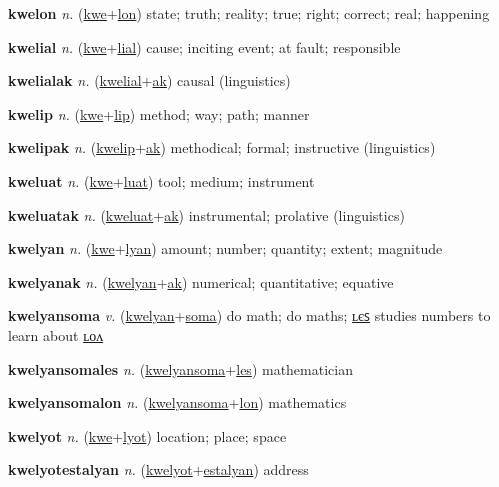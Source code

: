 \textbf{\hypertarget{kwelon}{kwelon}} \textit{n.} (\hyperlink{kwe}{kwe}+\allowbreak \hyperlink{lon}{lon})
state; truth; reality; true; right; correct; real; happening

\textbf{\hypertarget{kwelial}{kwelial}} \textit{n.} (\hyperlink{kwe}{kwe}+\allowbreak \hyperlink{lial}{lial})
cause; inciting event; at fault; responsible

\textbf{\hypertarget{kwelialak}{kwelialak}} \textit{n.} (\hyperlink{kwelial}{kwelial}+\allowbreak \hyperlink{ak}{ak})
causal (linguistics)

\textbf{\hypertarget{kwelip}{kwelip}} \textit{n.} (\hyperlink{kwe}{kwe}+\allowbreak \hyperlink{lip}{lip})
method; way; path; manner

\textbf{\hypertarget{kwelipak}{kwelipak}} \textit{n.} (\hyperlink{kwelip}{kwelip}+\allowbreak \hyperlink{ak}{ak})
methodical; formal; instructive (linguistics)

\textbf{\hypertarget{kweluat}{kweluat}} \textit{n.} (\hyperlink{kwe}{kwe}+\allowbreak \hyperlink{luat}{luat})
tool; medium; instrument

\textbf{\hypertarget{kweluatak}{kweluatak}} \textit{n.} (\hyperlink{kweluat}{kweluat}+\allowbreak \hyperlink{ak}{ak})
instrumental; prolative (linguistics)

\textbf{\hypertarget{kwelyan}{kwelyan}} \textit{n.} (\hyperlink{kwe}{kwe}+\allowbreak \hyperlink{lyan}{lyan})
amount; number; quantity; extent; magnitude

\textbf{\hypertarget{kwelyanak}{kwelyanak}} \textit{n.} (\hyperlink{kwelyan}{kwelyan}+\allowbreak \hyperlink{ak}{ak})
numerical; quantitative; equative

\textbf{\hypertarget{kwelyansoma}{kwelyansoma}} \textit{v.} (\hyperlink{kwelyan}{kwelyan}+\allowbreak \hyperlink{soma}{soma})
do math; do maths; \hyperlink{kwelyansomales}{ʟєꜱ} studies numbers to learn about \hyperlink{kwelyansomalon}{ʟᴏᴧ}

\textbf{\hypertarget{kwelyansomales}{kwelyansomales}} \textit{n.} (\hyperlink{kwelyansoma}{kwelyansoma}+\allowbreak \hyperlink{les}{les})
mathematician

\textbf{\hypertarget{kwelyansomalon}{kwelyansomalon}} \textit{n.} (\hyperlink{kwelyansoma}{kwelyansoma}+\allowbreak \hyperlink{lon}{lon})
mathematics

\textbf{\hypertarget{kwelyot}{kwelyot}} \textit{n.} (\hyperlink{kwe}{kwe}+\allowbreak \hyperlink{lyot}{lyot})
location; place; space

\textbf{\hypertarget{kwelyotestalyan}{kwelyotestalyan}} \textit{n.} (\hyperlink{kwelyot}{kwelyot}+\allowbreak \hyperlink{estalyan}{estalyan})
address

